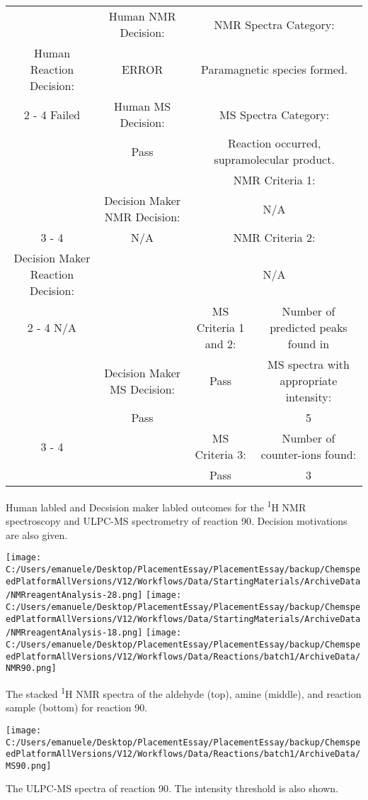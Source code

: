 \documentclass{article}%
\begin{document}
\begin{Decision Table}[H]%
\begin{tabular}{|c|c|c|c|}%
\hline%
&Human NMR Decision:&\multicolumn{2}{|c|}{NMR Spectra Category:}\\%
Human Reaction Decision:&ERROR&\multicolumn{2}{|c|}{Paramagnetic species formed.}\\%
\cline{2%
-%
4}%
Failed&Human MS Decision:&\multicolumn{2}{|c|}{MS Spectra Category:}\\%
&Pass&\multicolumn{2}{|c|}{Reaction occurred, supramolecular product.}\\%
\hline%
&&\multicolumn{2}{|c|}{NMR Criteria 1:}\\%
&Decision Maker NMR Decision:&\multicolumn{2}{|c|}{N/A}\\%
\cline{3%
-%
4}%
&N/A&\multicolumn{2}{|c|}{NMR Criteria 2:}\\%
Decision Maker Reaction Decision:&&\multicolumn{2}{|c|}{N/A}\\%
\cline{2%
-%
4}%
N/A&&MS Criteria 1 and 2:&Number of predicted peaks found in\\%
&Decision Maker MS Decision:&Pass&MS spectra with appropriate intensity:\\%
&Pass&&5\\%
\cline{3%
-%
4}%
&&MS Criteria 3:&Number of counter{-}ions found:\\%
&&Pass&3\\%
\hline%
\end{tabular}%
\caption{Human labled and Decsision maker labled outcomes for the \textsuperscript{1}H NMR spectroscopy and ULPC-MS spectrometry of reaction 90. Decision motivations are also given.}%
\end{Decision Table}%
\begin{NMR Spectra}[H]%
\begin{center}%
\texttt{[image: C:/Users/emanuele/Desktop/PlacementEssay/PlacementEssay/backup/ChemspeedPlatformAllVersions/V12/Workflows/Data/StartingMaterials/ArchiveData/NMRreagentAnalysis-28.png]}\hfill%
\texttt{[image: C:/Users/emanuele/Desktop/PlacementEssay/PlacementEssay/backup/ChemspeedPlatformAllVersions/V12/Workflows/Data/StartingMaterials/ArchiveData/NMRreagentAnalysis-18.png]}\hfill%
\texttt{[image: C:/Users/emanuele/Desktop/PlacementEssay/PlacementEssay/backup/ChemspeedPlatformAllVersions/V12/Workflows/Data/Reactions/batch1/ArchiveData/NMR90.png]}\hfill%
\end{center}%
\caption{The stacked \textsuperscript{1}H NMR spectra of the aldehyde (top), amine (middle), and reaction sample (bottom) for reaction 90.}%
\end{NMR Spectra}%
\begin{MS Spectra}[H]%
\begin{center}%
\texttt{[image: C:/Users/emanuele/Desktop/PlacementEssay/PlacementEssay/backup/ChemspeedPlatformAllVersions/V12/Workflows/Data/Reactions/batch1/ArchiveData/MS90.png]}\hfill%
\end{center}%
\caption{The ULPC-MS spectra of reaction 90. The intensity threshold is also shown.}%
\end{MS Spectra}%
\end{document}
